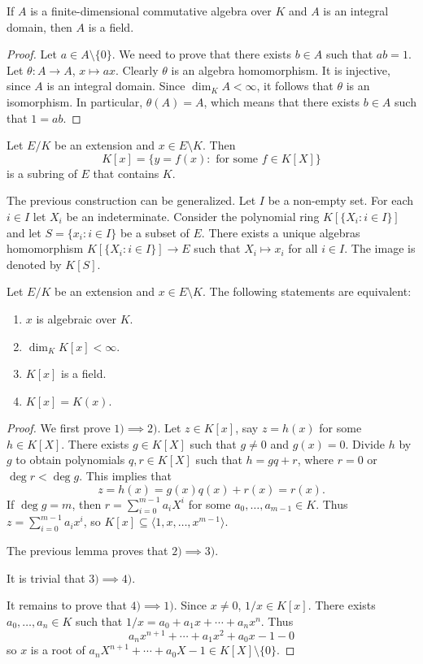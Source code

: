 \begin{lemma}
If $A$ is a finite-dimensional commutative algebra over $K$ 
and $A$ is an integral domain, then $A$ is a field. 
\end{lemma}

\begin{proof}
	Let $a\in A\setminus\{0\}$. We need to prove that there exists $b\in A$
	such that $ab=1$. Let $\theta\colon A\to A$, $x\mapsto ax$. Clearly
	$\theta$ is an algebra homomorphism. It is injective, since $A$ is an
	integral domain.  Since $\dim_KA<\infty$, it follows that $\theta$ is an
	isomorphism. In particular, $\theta(A)=A$, which means that there exists
	$b\in A$ such that $1=ab$. 
\end{proof}

Let $E/K$ be an extension and $x\in E\setminus K$. 
Then 
\[
K[x]=\{y=f(x):\text{ for some $f\in K[X]$}\}
\]
is a subring of $E$ that contains $K$. 

The previous construction
can be generalized. Let $I$ be a non-empty set. 
For each $i\in I$ let $X_i$ be an indeterminate. Consider
the polynomial ring $K[\{X_i:i\in I\}]$ and let 
$S=\{x_i:i\in I\}$ be a subset of $E$. There exists a unique 
algebras homomorphism $K[\{X_i:i\in I\}]\to E$ 
such that $X_i\mapsto x_i$ for all $i\in I$. The image 
is denoted by $K[S]$. 

\begin{theorem}
	Let $E/K$ be an extension and $x\in E\setminus K$.
	The following statements are equivalent:
	\begin{enumerate}
		\item $x$ is algebraic over $K$.
		\item $\dim_KK[x]<\infty$.
		\item $K[x]$ is a field.
		\item $K[x]=K(x)$. 
	\end{enumerate}
\end{theorem}

\begin{proof}
	We first prove $1)\implies 2)$. Let $z\in K[x]$, say $z=h(x)$ for some $h\in K[X]$. There exists
	$g\in K[X]$ such that $g\ne 0$ and $g(x)=0$. Divide $h$ by $g$ to obtain 
	polynomials $q,r\in K[X]$ such that $h=gq+r$, where $r=0$ or $\deg r<\deg g$. This implies that
	\[
		z=h(x)=g(x)q(x)+r(x)=r(x).
	\]
	If $\deg g=m$, then $r=\sum_{i=0}^{m-1}a_iX^i$ for some $a_0,\dots,a_{m-1}\in K$. Thus
	$z=\sum_{i=0}^{m-1}a_ix^i$, so $K[x]\subseteq\langle 1,x,\dots,x^{m-1}\rangle$. 

	The previous lemma proves that $2)\implies 3)$. 

	It is trivial that $3)\implies 4)$. 

	It remains to prove that $4)\implies 1)$. 
	Since $x\ne 0$, $1/x\in K[x]$. There exists $a_0,\dots,a_n\in K$ such that
	$1/x=a_0+a_1x+\cdots+a_nx^n$. Thus
	\[
		a_nx^{n+1}+\cdots+a_1x^2+a_0x-1- 0
	\]
	so $x$ is a root of $a_nX^{n+1}+\cdots+a_0X-1\in K[X]\setminus\{0\}$. 
\end{proof}


